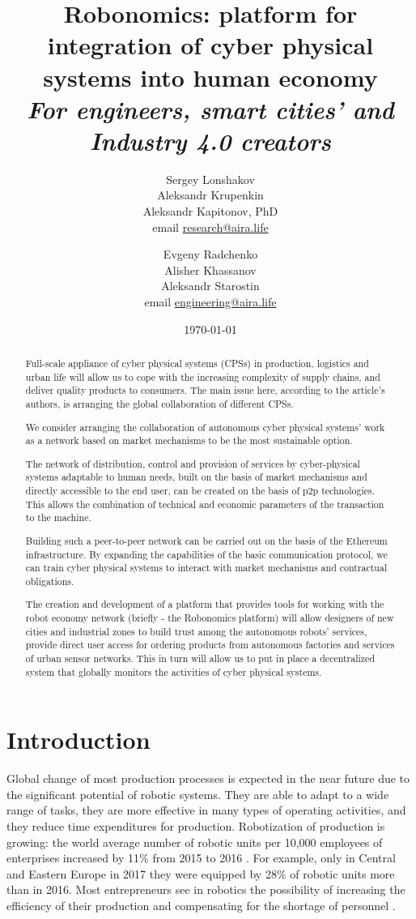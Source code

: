 \documentclass{article}
\title{Robonomics: platform for integration of cyber physical systems into human economy \\ \small
\textit{For engineers, smart cities’ and Industry 4.0 creators}}
\date{\today}
\author{Sergey Lonshakov \\ Aleksandr Krupenkin \\ Aleksandr Kapitonov, PhD \\ email \href{mailto:research@aira.life}{research@aira.life} \and Evgeny Radchenko \\ Alisher Khassanov \\ Aleksandr Starostin \\ email \href{mailto:engineering@aira.life}{engineering@aira.life} }
\begin{document}
\maketitle
 
\begin{abstract}
Full-scale appliance of cyber physical systems (CPSs) in production, logistics and urban life will allow us to cope with the increasing complexity of supply chains, and deliver quality products to consumers. The main issue here, according to the article’s authors, is arranging the global collaboration of different CPSs.

We consider arranging the collaboration of autonomous cyber physical systems’ work as a network based on market mechanisms to be the most sustainable option.

The network of distribution, control and provision of services by cyber-physical systems adaptable to human needs, built on the basis of market mechanisms and directly accessible to the end user, can be created on the basis of p2p technologies. This allows the combination of technical and economic parameters of the transaction to the machine.

Building such a peer-to-peer network can be carried out on the basis of the Ethereum infrastructure. By expanding the capabilities of the basic communication protocol, we can train cyber physical systems to interact with market mechanisms and contractual obligations.

The creation and development of a platform that provides tools for working with the robot economy network (briefly - the Robonomics platform) will allow designers of new cities and industrial zones to build trust among the autonomous robots’ services, provide direct user access for ordering products from autonomous factories and services of urban sensor networks. This in turn will allow us to put in place a decentralized system that globally monitors the activities of cyber physical systems.
\end{abstract}

\tableofcontents

\section{Introduction}
Global change of most production processes is expected in the near future \cite{Pedersen2016RobotDeployment}  due to the significant potential of robotic systems. They are able to adapt \cite{Stock2016Opportunities4.0} to a wide range of tasks, they are more effective in many types of operating activities, and they reduce time expenditures for production. Robotization of production is growing: the world average number of robotic units per 10,000 employees of enterprises increased by 11\% from 2015 to 2016 \cite{2018RobotRobotics.}. For example, only in Central and Eastern Europe in 2017 they were equipped by 28\% \cite{2018EnterFactories} of robotic units more than in 2016. Most entrepreneurs see in robotics the possibility of increasing the efficiency of their production and compensating for the shortage of personnel \cite{2018EnterFactories}.
\end{document}
